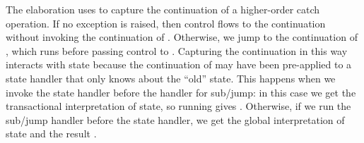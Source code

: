 %
The elaboration uses  to capture the continuation of a higher-order \ac{catch} operation.
If no exception is raised, then control flows to the continuation  without invoking the continuation of .
Otherwise, we jump to the continuation of , which runs  before passing control to .
Capturing the continuation in this way interacts with state because the continuation of  may have been pre-applied to a state handler that only knows about the ``old'' state.
This happens when we invoke the state handler before the handler for sub/jump: in this case we get the transactional interpretation of state, so running  gives .
Otherwise, if we run the sub/jump handler before the state handler, we get the global interpretation of state and the result .
%
\begin{code}[hide]%
%
\>[6]\<%
\\
%
\>[6]\<%
\\
%
\>[6]\<%
\\
%
\\[\AgdaEmptyExtraSkip]%
\>[0][@{}l@{\AgdaIndent{3}}]%
\>[4]\AgdaSpace{}%
\AgdaModule{\AgdaUnderscore{}}\AgdaSpace{}%
\<%
\\
\>[4][@{}l@{\AgdaIndent{0}}]%
\>[6]\AgdaSpace{}%
\AgdaSpace{}%
\AgdaSpace{}%
\AgdaSymbol{(}\AgdaSymbol{;}\AgdaSpace{}%
\AgdaOperator{\AgdaFunction{\AgdaUnderscore{}>>\AgdaUnderscore{}}}\AgdaSymbol{)}\<%
\\
%
\>[6]\AgdaSpace{}%
\AgdaSpace{}%
\AgdaSpace{}%
\AgdaSpace{}%
\AgdaSymbol{(}\AgdaSymbol{;}\AgdaSpace{}%
\AgdaOperator{\AgdaPrimitive{\AgdaUnderscore{}+\AgdaUnderscore{}}}\AgdaSymbol{)}\<%
\\
%
\>[6]\AgdaSpace{}%
\AgdaSpace{}%
\AgdaSpace{}%
\AgdaSpace{}%
\<%
\\
\>[0]\<%
\\
%
\>[6]%
\>[1679I]\AgdaSymbol{:}\AgdaSpace{}%
\AgdaSpace{}%
\AgdaSpace{}%
\AgdaSymbol{:}\AgdaSpace{}%
\AgdaSpace{}%
\<%
\\

\end{code}
